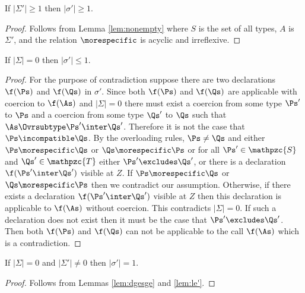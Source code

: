 \begin{lemma}
\label{lem:dgesge}
If $|\Sigma'| \ge 1$ then $|\sigma'| \ge 1$.
\end{lemma}

\begin{proof}
Follows from Lemma \ref{lem:nonempty} where $S$ is the set of all
types, $A$ is %
$\Sigma'$, %
and the relation %
$\morespecific$ is acyclic and irreflexive.
\end{proof}

\begin{lemma}
\label{lem:le'}
If $|\Sigma| = 0$ then $|\sigma'| \le 1$.
\end{lemma}

\begin{proof}
For the purpose of contradiction suppose there are two declarations
$\f(\Ps)$ and $\f(\Qs)$ in $\sigma'$.  Since both $\f(\Ps)$ and
$\f(\Qs)$ are applicable with coercion to $\f(\As)$ and $|\Sigma| =
0$ there must exist a coercion from some type $\Ps'$ to $\Ps$ and a
coercion from some type $\Qs'$ to $\Qs$ such that $\As \Ovrsubtype
\Ps' \inter \Qs'$.  Therefore it is not the case that $\Ps
\incompatible \Qs$.  By the overloading rules, $\Ps \neq \Qs$
and either $\Ps \morespecific \Qs$ or $\Qs \morespecific \Ps$ or
for all $\Ps' \in \mathpzc{S}$ and $\Qs' \in \mathpzc{T}$ either $\Ps'
\excludes \Qs'$, or there is a declaration $\f(\Ps' \inter \Qs')$
visible at $Z$.  If $\Ps \morespecific \Qs$ or $\Qs \morespecific
\Ps$ then we contradict our assumption.  Otherwise, if there exists a
declaration $\f(\Ps' \inter \Qs')$ visible at $Z$ then this
declaration is applicable to $\f(\As)$ without coercion.  This
contradicts $|\Sigma| = 0$.  If such a declaration does not exist then
it must be the case that $\Ps' \excludes \Qs'$.  Then both $\f(\Ps)$
and $\f(\Qs)$ can not be applicable to the call $\f(\As)$ which is a
contradiction.
\end{proof}

\begin{theorem}
\label{thm:overloading-coercion}
If $|\Sigma| = 0$ and $|\Sigma'| \neq 0$ then $|\sigma'| = 1$.
\end{theorem}

\begin{proof}
Follows from Lemmas \ref{lem:dgesge} and \ref{lem:le'}.
\end{proof}
